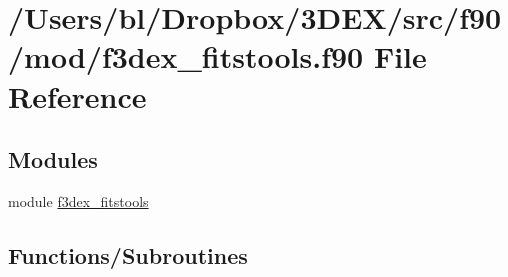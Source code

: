 \hypertarget{f3dex__fitstools_8f90}{
\section{/Users/bl/Dropbox/3DEX/src/f90/mod/f3dex\_\-fitstools.f90 File Reference}
\label{f3dex__fitstools_8f90}
}
\subsection*{Modules}
\begin{DoxyCompactItemize}
\item 
module \hyperlink{namespacef3dex__fitstools}{f3dex\_\-fitstools}
\end{DoxyCompactItemize}
\subsection*{Functions/Subroutines}
